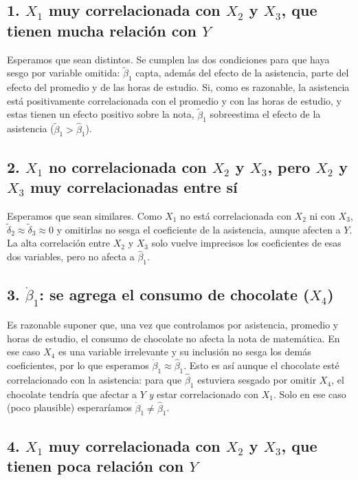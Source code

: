 \documentclass[11pt,a4paper]{article}
\begin{document}
\subsection*{1. $X_1$ muy correlacionada con $X_2$ y $X_3$, que tienen mucha relación con $Y$}

Esperamos que sean distintos. Se cumplen las dos condiciones para que haya sesgo por variable omitida: $\tilde\beta_1$ capta, además del efecto de la asistencia, parte del efecto del promedio y de las horas de estudio. Si, como es razonable, la asistencia está positivamente correlacionada con el promedio y con las horas de estudio, y estas tienen un efecto positivo sobre la nota, $\tilde\beta_1$ sobreestima el efecto de la asistencia ($\tilde\beta_1>\hat\beta_1$).

\subsection*{2. $X_1$ no correlacionada con $X_2$ y $X_3$, pero $X_2$ y $X_3$ muy correlacionadas entre sí}

Esperamos que sean similares. Como $X_1$ no está correlacionada con $X_2$ ni con $X_3$, $\tilde\delta_2\approx\tilde\delta_3\approx0$ y omitirlas no sesga el coeficiente de la asistencia, aunque afecten a $Y$. La alta correlación entre $X_2$ y $X_3$ solo vuelve imprecisos los coeficientes de esas dos variables, pero no afecta a $\hat\beta_1$.

\subsection*{3. $\dot\beta_1$: se agrega el consumo de chocolate ($X_4$)}

Es razonable suponer que, una vez que controlamos por asistencia, promedio y horas de estudio, el consumo de chocolate no afecta la nota de matemática. En ese caso $X_4$ es una variable irrelevante y su inclusión no sesga los demás coeficientes, por lo que esperamos $\dot\beta_1\approx\hat\beta_1$. Esto es así aunque el chocolate esté correlacionado con la asistencia: para que $\hat\beta_1$ estuviera sesgado por omitir $X_4$, el chocolate tendría que afectar a $Y$ \emph{y} estar correlacionado con $X_1$. Solo en ese caso (poco plausible) esperaríamos $\dot\beta_1\neq\hat\beta_1$.

\subsection*{4. $X_1$ muy correlacionada con $X_2$ y $X_3$, que tienen poca relación con $Y$}
\end{document}
